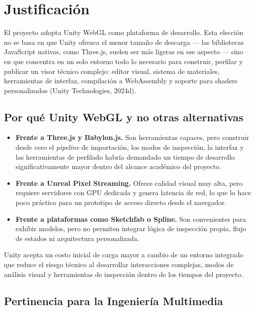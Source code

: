 \section{Justificaci\'on}

El proyecto adopta Unity WebGL como plataforma de desarrollo. Esta elecci\'on no se basa en que Unity ofrezca el menor tama\~no de descarga — las bibliotecas JavaScript nativas, como Three.js, suelen ser m\'as ligeras en ese aspecto — sino en que concentra en un solo entorno todo lo necesario para construir, perfilar y publicar un visor t\'ecnico complejo: editor visual, sistema de materiales, herramientas de interfaz, compilaci\'on a WebAssembly y soporte para shaders personalizados (Unity Technologies, 2024d).

\subsection{Por qu\'e Unity WebGL y no otras alternativas}

\begin{itemize}
    \item \textbf{Frente a Three.js y Babylon.js.} Son herramientas capaces, pero construir desde cero el \textit{pipeline} de importaci\'on, los modos de inspecci\'on, la interfaz y las herramientas de perfilado habr\'ia demandado un tiempo de desarrollo significativamente mayor dentro del alcance acad\'emico del proyecto.
    \item \textbf{Frente a Unreal Pixel Streaming.} Ofrece calidad visual muy alta, pero requiere servidores con GPU dedicada y genera latencia de red, lo que lo hace poco pr\'actico para un prototipo de acceso directo desde el navegador.
    \item \textbf{Frente a plataformas como Sketchfab o Spline.} Son convenientes para exhibir modelos, pero no permiten integrar l\'ogica de inspecci\'on propia, flujo de estados ni arquitectura personalizada.
\end{itemize}

Unity acepta un costo inicial de carga mayor a cambio de un entorno integrado que reduce el riesgo t\'ecnico al desarrollar interacciones complejas, modos de an\'alisis visual y herramientas de inspecci\'on dentro de los tiempos del proyecto.

\subsection{Pertinencia para la Ingenier\'ia Multimedia}

